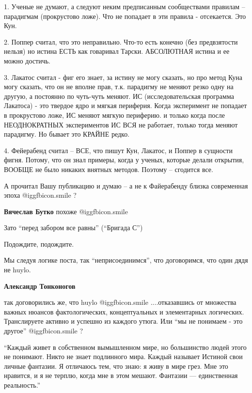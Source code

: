 \begin{itemize}
1. Ученые не думают, а следуют неким предписанным сообществами правилам –
парадигмам (прокрустово ложе). Что не попадает в эти правила - отсекается. Это
Кун.

2. Поппер считал, что это неправильно. Что-то есть конечно (без предвзятости
нельзя) но истина ЕСТЬ как говаривал Тарски. АБСОЛЮТНАЯ истина и ее можно
достичь.

3. Лакатос считал - фиг его знает, за истину не могу сказать, но про метод Куна
могу сказать, что он не вполне прав, т.к. парадигму не меняют резко одну на
другую, а постоянно по чуть-чуть меняют. ИС (исследовательская программа
Лакатоса) - это твердое ядро и мягкая периферия. Когда эксперимент не попадает
в прокрустово ложе, ИС меняют мягкую периферию. и только когда после
НЕОДНОКРАТНЫХ экспериментов ИС ВСЯ не работает, только тогда меняют парадигму.
Но бывает это КРАЙНЕ редко.

4. Фейерабенд считал – ВСЕ, что пишут Кун, Лакатос, и Поппер в сущности фигня.
Потому, что он знал примеры, когда у ученых, которые делали открытия, ВООБЩЕ не
было никаких внятных методов. Поэтому – сгодится все.

А прочитал Вашу публикацию и думаю – а не к Файерабенду близка современная
эпоха  @igg{fbicon.smile} ?

\textbf{Вячеслав Бутко} похоже  @igg{fbicon.smile} 

Зато \enquote{перед забором все равны} (\enquote{Бригада С})

Подождите, подождите.

Мы следуя логике поста, так \enquote{неприсоединимся}, что договоримся, что один дядя
не huylo.

\begin{itemize} %
\textbf{Александр Тонконогов} 

так договорились же, что huylo  @igg{fbicon.smile} ....отказавшись от множества важных нюансов
фактологических, концептуальных и элементарных логических. Транслируете активно
и успешно из каждого утюга. Или \enquote{мы не понимаем - это другое}  @igg{fbicon.smile}  ?

\end{itemize} %


\enquote{Каждый живет в собственном вымышленном мире, но большинство людей этого не
понимают. Никто не знает подлинного мира. Каждый называет Истиной свои личные
фантазии. Я отличаюсь тем, что знаю: я живу в мире грез. Мне это нравится, и я
не терплю, когда мне в этом мешают. Фантазии — единственная реальность.}


\end{itemize}
